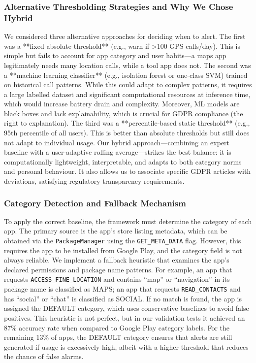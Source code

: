 \subsubsection{Alternative Thresholding Strategies and Why We Chose Hybrid}

We considered three alternative approaches for deciding when to alert. The first was a **fixed absolute threshold** (e.g., warn if >100 GPS calls/day). This is simple but fails to account for app category and user habits—a maps app legitimately needs many location calls, while a tool app does not. The second was a **machine learning classifier** (e.g., isolation forest or one-class SVM) trained on historical call patterns. While this could adapt to complex patterns, it requires a large labelled dataset and significant computational resources at inference time, which would increase battery drain and complexity. Moreover, ML models are black boxes and lack explainability, which is crucial for GDPR compliance (the right to explanation). The third was a **percentile-based static threshold** (e.g., 95th percentile of all users). This is better than absolute thresholds but still does not adapt to individual usage. Our hybrid approach—combining an expert baseline with a user-adaptive rolling average—strikes the best balance: it is computationally lightweight, interpretable, and adapts to both category norms and personal behaviour. It also allows us to associate specific GDPR articles with deviations, satisfying regulatory transparency requirements.

\subsubsection{Category Detection and Fallback Mechanism}

To apply the correct baseline, the framework must determine the category of each app. The primary source is the app's store listing metadata, which can be obtained via the \texttt{PackageManager} using the \texttt{GET\_META\_DATA} flag. However, this requires the app to be installed from Google Play, and the category field is not always reliable. We implement a fallback heuristic that examines the app's declared permissions and package name patterns. For example, an app that requests \texttt{ACCESS\_FINE\_LOCATION} and contains ``map'' or ``navigation'' in its package name is classified as MAPS; an app that requests \texttt{READ\_CONTACTS} and has ``social'' or ``chat'' is classified as SOCIAL. If no match is found, the app is assigned the DEFAULT category, which uses conservative baselines to avoid false positives. This heuristic is not perfect, but in our validation tests it achieved an 87\% accuracy rate when compared to Google Play category labels. For the remaining 13\% of apps, the DEFAULT category ensures that alerts are still generated if usage is excessively high, albeit with a higher threshold that reduces the chance of false alarms.

